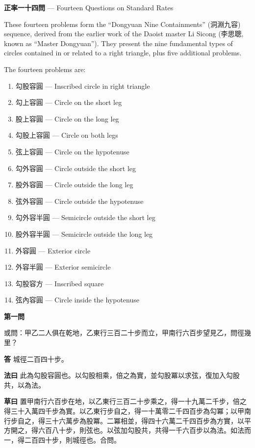 \documentclass[11pt,a4paper]{article}
\newcommand{\problem}[1]{\par\noindent\textbf{\color{problemcolor}#1}\par\nopagebreak}
\newcommand{\answer}[1]{\par\noindent\textbf{答} #1\par}
\newcommand{\method}[1]{\par\noindent\textbf{法曰} #1\par}
\newcommand{\workings}[1]{\par\noindent\textbf{草曰} #1\par}
\begin{document}
\textbf{正率一十四問} --- Fourteen Questions on Standard Rates

These fourteen problems form the ``Dongyuan Nine Containments'' (洞淵九容) sequence, derived from the earlier work of the Daoist master Li Sicong (李思聰, known as ``Master Dongyuan''). They present the nine fundamental types of circles contained in or related to a right triangle, plus five additional problems.

The fourteen problems are:

\begin{enumerate}[leftmargin=2em]
  \item 勾股容圓 --- Inscribed circle in right triangle
  \item 勾上容圓 --- Circle on the short leg
  \item 股上容圓 --- Circle on the long leg
  \item 勾股上容圓 --- Circle on both legs
  \item 弦上容圓 --- Circle on the hypotenuse
  \item 勾外容圓 --- Circle outside the short leg
  \item 股外容圓 --- Circle outside the long leg
  \item 弦外容圓 --- Circle outside the hypotenuse
  \item 勾外容半圓 --- Semicircle outside the short leg
  \item 股外容半圓 --- Semicircle outside the long leg
  \item 外容圓 --- Exterior circle
  \item 外容半圓 --- Exterior semicircle
  \item 勾股容方 --- Inscribed square
  \item 弦內容圓 --- Circle inside the hypotenuse
\end{enumerate}

\problem{第一問}

\noindent 或問：甲乙二人俱在乾地，乙東行三百二十步而立，甲南行六百步望見乙，問徑幾里？

\answer{城徑二百四十步。}

\method{此為勾股容圓也。以勾股相乘，倍之為實，並勾股冪以求弦，復加入勾股共，以為法。}

\workings{置甲南行六百步在地，以乙東行三百二十步乘之，得一十九萬二千步，倍之得三十入萬四千步為實。以乙東行步自之，得一十萬零二千四百步為勾冪；以甲南行步自之，得三十六萬步為股冪。二冪相並，得四十六萬二千四百步為方實，以平方開之，得六百八十步，則弦也。以弦加勾股共，共得一千六百步以為法。如法而一，得二百四十步，則城徑也。合問。}
\end{document}
